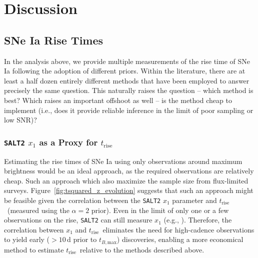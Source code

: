 \documentclass[twocolumn]{./aastex63}
\newcommand{\trise}{$t_\mathrm{rise}$}
\newcommand{\tbmax}{$t_{B,\mathrm{max}}$}
\begin{document}
\section{Discussion}

\subsection{SNe Ia Rise Times}

In the analysis above, we provide multiple measurements of the rise time of SNe
Ia following the adoption of different priors. Within the literature, there are
at least a half dozen entirely different methods that have been employed to
answer precisely the same question. This naturally raises the question -- which
method is best? Which raises an important offshoot as well -- is the method
cheap to implement (i.e., does it provide reliable inference in the limit of
poor sampling or low SNR)?

\subsubsection{\texttt{SALT2} $x_1$ as a Proxy for \trise}\label{sec:x1_rise}

Estimating the rise times of SNe Ia using only observations around maximum
brightness would be an ideal approach, as the required observations are
relatively cheap. Such an approach which also maximize the sample size from
flux-limited surveys. Figure~\ref{fig:tsquared_z_evolution} suggests that such
an approach might be feasible given the correlation between the \texttt{SALT2}
$x_1$ parameter and \trise\ (measured using the $\alpha = 2$ prior). Even in
the limit of only one or a few observations on the rise, \texttt{SALT2} can
still measure $x_1$ (e.g., \citealt{Scolnic18a}). Therefore, the correlation
between $x_1$ and \trise\ eliminates the need for high-cadence observations to
yield early ($> 10$\,d prior to \tbmax) discoveries, enabling a more
economical method to estimate \trise\ relative to the methods described above.
\end{document}
